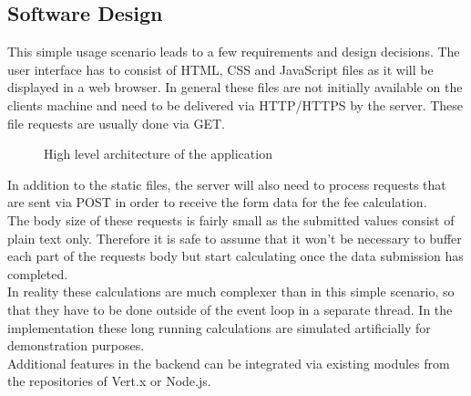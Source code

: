 




\FloatBarrier
\subsection{Software Design}
\label{software_design}


This simple usage scenario leads to a few requirements and
design decisions.
The user interface has to consist of HTML, CSS and JavaScript files as it 
will be displayed in a web browser. In general these files are not initially
available on the clients machine and need to be delivered via HTTP/HTTPS by the
server. These file requests are usually done via GET.\\

\begin{figure}[h]
	\centering
	\setlength\fboxsep{2pt}
	\caption{High level architecture of the application}
	\label{fig:high_level_architecture}
\end{figure}

In addition to the static files, the server will also need to process
requests that are sent via POST in order to receive the form data for the
fee calculation.\\
The body size of these requests is fairly small as the submitted values consist
of plain text only. Therefore it is safe to assume that it won't be necessary to
buffer each part of the requests body but start calculating once the data
submission has completed.\\
In reality these calculations are much complexer than in this simple scenario,
so that they have to be done outside of the event loop in a separate thread.
In the implementation these long running calculations are simulated artificially for
demonstration purposes.\\
Additional features in the backend can be integrated via existing modules from
the repositories of Vert.x or Node.js.

